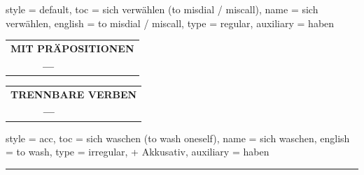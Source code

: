 \begin{verbentry}{
  style = {default},
  toc = {sich verwählen (to misdial / miscall)},
  name = {sich verwählen},
  english = {to misdial / miscall},
  type = {regular},
  auxiliary = {haben}
}
\vspace{10pt}

\begin{tabular}{lll}
\multicolumn{3}{l}{\textbf{MIT PRÄPOSITIONEN}}\\
& \textbf{---} & \\
\end{tabular}
\hfill
\begin{tabular}{lll}
\multicolumn{3}{l}{\textbf{TRENNBARE VERBEN}}\\
& \textbf{---} & \\
\end{tabular}
\vspace{-5pt}
\end{verbentry}

\begin{verbentry}{
  style = {acc},
  toc = {sich waschen (to wash oneself)},
  name = {sich waschen},
  english = {to wash},
  type = {irregular, + Akkusativ},
  auxiliary = {haben}
}
 
    
       \vspace{5pt}

    \hrule
    
    \vspace{5pt}


\end{verbentry}
